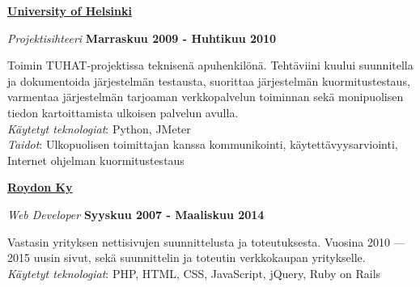 \documentclass[10pt,finnish,a4paper]{article}
\newenvironment{outerlist}[1][\enskip\textbullet]%
        {\begin{itemize}[#1]}{\end{itemize}%
         \vspace{-.6\baselineskip}}
\newenvironment{innerlist}[1][\enskip\textbullet]%
        {\begin{compactitem}[#1]}{\end{compactitem}}
\newcommand{\blankline}{\quad\pagebreak[2]}
\begin{document}
\href{http://www.helsinki.fi/university/index.html}{\textbf{University of Helsinki}}
\begin{outerlist}

\item[] \textit{Projektisihteeri}%
    \hfill \textbf{Marraskuu 2009 - Huhtikuu 2010}
    \begin{innerlist}
        \item Toimin TUHAT-projektissa teknisenä apuhenkilönä. Tehtäviini kuului suunnitella ja dokumentoida järjestelmän testausta, suorittaa järjestelmän kuormitustestaus, varmentaa järjestelmän tarjoaman verkkopalvelun toiminnan sekä monipuolisen tiedon kartoittamista ulkoisen palvelun avulla.\\

        \emph{Käytetyt teknologiat}: Python, JMeter\\
        \emph{Taidot}: Ulkopuolisen toimittajan kanssa kommunikointi, käytettävyysarviointi, Internet ohjelman kuormitustestaus
    \end{innerlist}
\end{outerlist}
\blankline

\href{http://roydon.fi}{\textbf{Roydon Ky}}
\begin{outerlist}

\item[] \textit{Web Developer}%
    \hfill \textbf{Syyskuu 2007 - Maaliskuu 2014}
    \begin{innerlist}
        \item Vastasin yrityksen nettisivujen suunnittelusta ja toteutuksesta. Vuosina 2010 — 2015 uusin sivut, sekä suunnittelin ja toteutin verkkokaupan yritykselle.\\

        \emph{Käytetyt teknologiat}: PHP, HTML, CSS, JavaScript, jQuery, Ruby on Rails\\
    \end{innerlist}
\end{outerlist}
\blankline

\clearpage
\end{document}
